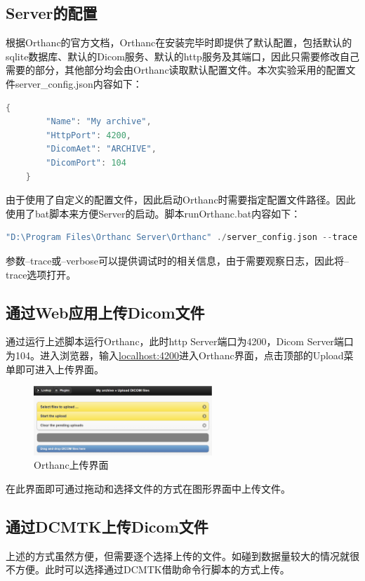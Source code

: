 \documentclass[UTF8]{ctexart}
\begin{document}
\subsection{Server的配置}
根据Orthanc的官方文档\cite{OrthancBook}，Orthanc在安装完毕时即提供了默认配置，包括默认的sqlite数据库、默认的Dicom服务、默认的http服务及其端口，因此只需要修改自己需要的部分，其他部分均会由Orthanc读取默认配置文件。本次实验采用的配置文件server\_config.json内容如下：

\begin{lstlisting}[language=C]
    {
        "Name": "My archive",
        "HttpPort": 4200,
        "DicomAet": "ARCHIVE",
        "DicomPort": 104
    }
\end{lstlisting}

由于使用了自定义的配置文件，因此启动Orthanc时需要指定配置文件路径。因此使用了bat脚本来方便Server的启动。脚本runOrthanc.bat内容如下：
\begin{lstlisting}[language=C]
    "D:\Program Files\Orthanc Server\Orthanc" ./server_config.json --trace
\end{lstlisting}
参数--trace或--verbose可以提供调试时的相关信息，由于需要观察日志，因此将--trace选项打开。

\subsection{通过Web应用上传Dicom文件}
通过运行上述脚本运行Orthanc，此时http Server端口为4200，Dicom Server端口为104。进入浏览器，输入\url{localhost:4200}进入Orthanc界面，点击顶部的Upload菜单即可进入上传界面。

\begin{figure}[H]
    \centering
    \includegraphics[width=0.6\textwidth]{web upload.png}
    \caption{Orthanc上传界面}
    \label{fig:Orthanc Upload}
\end{figure}

在此界面即可通过拖动和选择文件的方式在图形界面中上传文件。

\subsection{通过DCMTK上传Dicom文件}
上述的方式虽然方便，但需要逐个选择上传的文件。如碰到数据量较大的情况就很不方便。此时可以选择通过DCMTK借助命令行脚本的方式上传。
\end{document}

